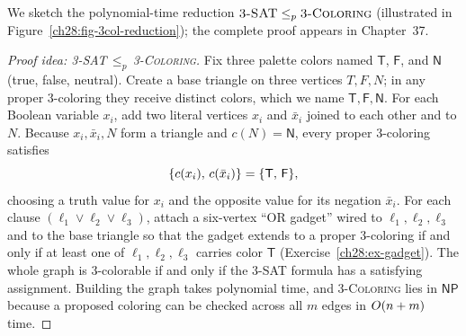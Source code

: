 We sketch the polynomial-time reduction $\textsc{3-SAT}\le_p\textsc{3-Coloring}$ (illustrated in Figure~\ref{ch28:fig-3col-reduction}); the complete proof appears in Chapter~37.

\begin{proof}[Proof idea: \textsc{3-SAT}\,$\le_p$\,\textsc{3-Coloring}]
Fix three palette colors named $\mathsf{T}$, $\mathsf{F}$, and $\mathsf{N}$ (true,
false, neutral). Create a base triangle on three vertices $T,F,N$; in any proper $3$-coloring they receive distinct colors, which we name $\mathsf{T},\mathsf{F},\mathsf{N}$. For each Boolean variable $x_i$, add two literal vertices $x_i$ and $\bar x_i$
joined to each other and to $N$. Because $x_i,\bar x_i,N$ form a triangle and $c(N)=\mathsf{N}$, every proper $3$-coloring satisfies
\[
  \{c(x_i),\,c(\bar x_i)\} = \{\mathsf{T},\,\mathsf{F}\},
\]
choosing a truth value for $x_i$ and the opposite value for its negation $\bar x_i$. For each clause $(\ell_1\lor\ell_2\lor\ell_3)$, attach a six-vertex ``OR gadget'' wired to $\ell_1,\ell_2,\ell_3$ and to the base triangle so that the gadget extends to a proper $3$-coloring if and only if at least one of $\ell_1,\ell_2,\ell_3$ carries color $\mathsf{T}$ (Exercise~\ref{ch28:ex-gadget}). The whole graph is $3$-colorable if and only if the \textsc{3-SAT} formula has a satisfying assignment. Building the graph takes polynomial time, and \textsc{3-Coloring} lies in $\mathsf{NP}$ because a proposed coloring can be checked across all $m$ edges in $O(n+m)$ time.
\end{proof}

